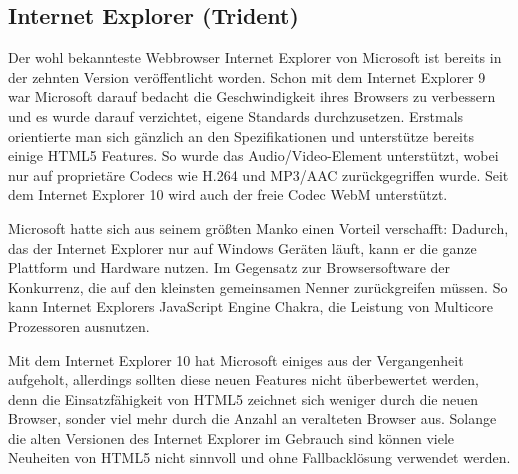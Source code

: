 \subsection{Internet Explorer (Trident)}
Der wohl bekannteste Webbrowser Internet Explorer von Microsoft ist bereits in
der zehnten Version veröffentlicht worden. Schon mit dem Internet Explorer 9 war
Microsoft darauf bedacht die Geschwindigkeit ihres Browsers zu verbessern und es
wurde darauf verzichtet, eigene Standards durchzusetzen.
Erstmals orientierte man sich gänzlich an den Spezifikationen und unterstütze
bereits einige HTML5 Features.
So wurde das Audio/Video-Element unterstützt, wobei nur auf proprietäre Codecs
wie H.264 und MP3/AAC zurückgegriffen wurde. Seit dem Internet Explorer 10 wird
auch der freie Codec WebM unterstützt.

Microsoft hatte sich aus seinem größten Manko einen Vorteil verschafft: Dadurch,
das der Internet Explorer nur auf Windows Geräten läuft, kann er die ganze
Plattform und Hardware nutzen. Im Gegensatz zur Browsersoftware der Konkurrenz,
die auf den kleinsten gemeinsamen Nenner zurückgreifen müssen.
So kann Internet Explorers JavaScript Engine Chakra, die Leistung von Multicore
Prozessoren ausnutzen.

Mit dem Internet Explorer 10 hat Microsoft einiges aus der Vergangenheit
aufgeholt, allerdings sollten diese neuen Features nicht überbewertet werden,
denn die Einsatzfähigkeit von HTML5 zeichnet sich weniger durch die neuen
Browser, sonder viel mehr durch die Anzahl an veralteten Browser aus. Solange
die alten Versionen des Internet Explorer im Gebrauch sind können viele
Neuheiten von HTML5 nicht sinnvoll und ohne Fallbacklösung verwendet werden.
